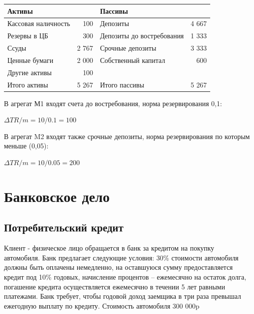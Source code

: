 \documentclass[12pt, table, a4paper,twoside]{exam}
\begin{document}
\begin{questions}
\begin{subparts}
\begin{solution}[12em]
		\begin{tabularx}{\linewidth}[b]{@{}>{\raggedright\arraybackslash}XrXr@{}}
				\toprule
				Активы &       & Пассивы &  \\
				\midrule
				Кассовая наличность & 100   & Депозиты &          4 667    \\
				Резервы в ЦБ & 300   &  Депозиты до востребования &          1 333    \\
				Ссуды & 2 767  &  Срочные депозиты &          3 333    \\
				Ценные бумаги & 2 000  &  Собственный капитал &             600    \\
				Другие активы & 100   &       &  \\
				\midrule
				Итого активы & 5 267  & Итого пассивы &          5 267    \\
				\bottomrule
			\end{tabularx}%
		
	\end{solution}
	
	\subpart[5] 
	
	\begin{solution}[12em]
		
		В агрегат М1 входят счета до востребования, норма резервирования 0,1:
		
		$\Delta TR / m = 10 / 0.1 = 100$
		
		В агрегат M2 входят также срочные депозиты, норма резервирования по которым меньше (0,05):
		
		$\Delta TR / m = 10 / 0.05 = 200$
	\end{solution}
	
\end{subparts}
\addpoints

\vfill\null\cleardoublepage
\raggedright
\section{Банковское дело}
\normalsize
\subsection{Потребительский кредит}
\question[15] Клиент - физическое лицо обращается в банк за кредитом на покупку автомобиля. Банк предлагает следующие условия: 30\% стоимости автомобиля должны быть оплачены немедленно, на оставшуюся сумму предоставляется кредит под 10\% годовых, начисление процентов – ежемесячно на остаток долга, погашение кредита осуществляется ежемесячно в течении 5 лет равными платежами. Банк требует, чтобы годовой доход заемщика в три раза превышал ежегодную выплату по кредиту.  Стоимость автомобиля 300 000p 
\noaddpoints


\end{questions}
\end{document}
